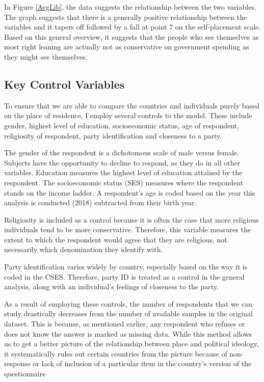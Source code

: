 \documentclass[12pt, titlepage]{article}
\begin{document}
In Figure \ref{AvgLib}, the data suggests the relationship between the two variables. The graph suggests that there is a generally positive relationship between the variables and it tapers off followed by a fall at point 7 on the self-placement scale. Based on this general overview, it suggests that the people who see themselves as most right leaning are actually not as conservative on government spending as they might see themselves.

\subsection{Key Control Variables}

To ensure that we are able to compare the countries and individuals purely based on the place of residence, I employ several controls to the model. These include gender, highest level of education, socioeconomic status, age of respondent, religiosity of respondent, party identification and closeness to a party. 

The gender of the respondent is a dichotomous scale of male versus female. Subjects have the opportunity to decline to respond, as they do in all other variables. Education measures the highest level of education attained by the respondent. The socioeconomic status (SES) measures where the respondent stands on the income ladder. A respondent's age is coded based on the year this analysis is conducted (2018) subtracted from their birth year. 

Religiosity is included as a control because it is often the case that more religious individuals tend to be more conservative. Therefore, this variable measures the extent to which the respondent would agree that they are religious, not necessarily which denomination they identify with. 

Party identification varies widely by country, especially based on the way it is coded in the CSES. Therefore, party ID is treated as a control in the general analysis, along with an individual's feelings of closeness to the party. 

As a result of employing these controls, the number of respondents that we can study drastically decreases from the number of available samples in the original dataset. This is because, as mentioned earlier, any respondent who refuses or does not know the answer is marked as missing data. While this method allows us to get a better picture of the relationship between place and political ideology, it systematically rules out certain countries from the picture because of non-response or lack of inclusion of a particular item in the country's version of the questionnaire 
\end{document}
